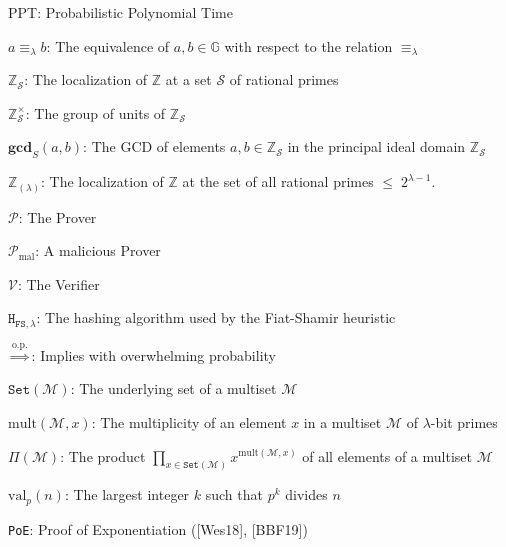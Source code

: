 \documentclass[11pt, lettersize, notitlepage, leqno, footskip=0.6cm]{article}
\newcommand{\bz}{\mathbb Z}
\newcommand{\pl}{\prod\limits}
\newcommand{\ttt}{\texttt}
\newcommand{\sett}{\ttt{Set}}
\newcommand{\eqlam}{\equiv_{\lam}}
\newcommand{\mc}{\mathcal}
\newcommand{\mb}{\mathbb}
\newcommand{\mbf}{\mathbf}
\newcommand{\mr}{\mathrm}
\newcommand{\lam}{\lambda}
\newcommand{\bzs}{\bz_{\mc{S}}}
\newcommand{\noin}{\noindent}
\newcommand{\GCD}{\mbf{gcd}}
\numberwithin{equation}{section}
\begin{document}
{{{\noin PPT: Probabilistic Polynomial Time \vspace{0.1cm}

\noindent $a\eqlam b$: The equivalence of $a,b\in\mb{G}$ with respect to the relation $\eqlam$ \vspace{0.1cm}

\noin $\bz_{\mc{S}}$: The localization of $\bz$ at a set $\mc{S}$ of rational primes \vspace{0.1cm}

\noin $\bzs^{\times}$: The group of units of $\bzs$ \vspace{0.1cm}

\noin $\GCD_S(a, b)$: The GCD of elements $a,b\in \bz_{\mc{S}}$ in the principal ideal domain $\bz_{\mc{S}}$ \vspace{0.1cm}

\noin $\bz_{(\lam)}$: The localization of $\bz$ at the set of all rational primes $\leq\; 2^{\lam-1}$. \vspace{0.1cm}

\noin $\mc{P}$: The Prover \vspace{0.1cm}

\noin $\mc{P}_{\mr{mal}}$: A malicious Prover \vspace{0.1cm}

\noin $\mc{V}$: The Verifier \vspace{0.1cm}

\noin $\ttt{H}_{\ttt{FS}, \lam}$: The hashing algorithm used by the Fiat-Shamir heuristic \vspace{0.1cm}

\noin $\overset{\mr{o.p.}}{\Longrightarrow}$: Implies with overwhelming probability \vspace{0.1cm}

\noin $\sett(\mc{M})$: The underlying set of a multiset $\mc{M}$ \vspace{0.1cm}

\noin $\mr{mult}(\mc{M},x)$: The multiplicity of an element $x$ in a multiset $\mc{M}$ of $\lam$-bit primes \vspace{0.1cm}

\noin $\Pi(\mc{M})$: The product $\pl_{x\in \sett(\mc{M})} x^{\mr{mult}(\mc{M},x)}$ of all elements of a multiset $\mc{M}$ \vspace{0.1cm}

\noin $\mr{val}_p(n)$: The largest integer $k$ such that $p^k$ divides $n$ \vspace{0.1cm}

\noin \verb|PoE|: Proof of Exponentiation ([Wes18], [BBF19])\vspace{0.1cm}

}}}
\end{document}
